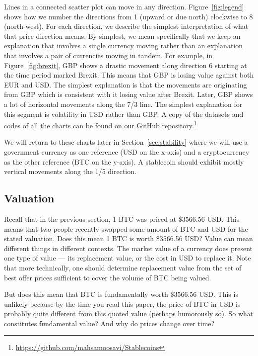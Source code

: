 Lines in a connected scatter plot can move in any direction. Figure~\ref{fig:legend} shows how we number the directions from 1 (upward or due north) clockwise to 8 (north-west). For each direction, we describe the simplest interpretation of what that price direction means. By simplest, we mean specifically that we keep an explanation that involves a single currency moving rather than an explanation that involves a pair of currencies moving in tandem. For example, in Figure~\ref{fig:brexit}, GBP shows a drastic movement along direction 6 starting at the time period marked Brexit. This means that GBP is losing value against both EUR and USD. The simplest explanation is that the movements are originating from GBP which is consistent with it losing value after Brexit. Later, GBP shows a lot of horizontal movements along the 7/3 line. The simplest explanation for this segment is volatility in USD rather than GBP.
A copy of the datasets and codes of all the charts can be found on our GitHub repository.\footnote{\url{https://github.com/mahsamoosavi/Stablecoins}}

We will return to these charts later in Section~\ref{sec:stability} where we will use a government currency as one reference (USD on the x-axis) and a cryptocurrency as the other reference (BTC on the y-axis). A stablecoin should exhibit mostly vertical movements along the 1/5 direction.

\subsection{Valuation}

Recall that in the previous section, 1 BTC was priced at \$3566.56 USD. This means that two people recently swapped some amount of BTC and USD for the stated valuation. Does this mean 1 BTC is worth \$3566.56 USD? Value can mean different things in different contexts. The market value of a currency does present one type of value --- its replacement value, or the cost in USD to replace it. Note that more technically, one should  determine replacement value from the set of best offer prices sufficient to cover the volume of BTC being valued.

But does this mean that BTC is fundamentally worth \$3566.56 USD. This is unlikely because by the time you read this paper, the price of BTC in USD is probably quite different from this quoted value (perhaps humorously so). So what constitutes fundamental value? And why do prices change over time?

